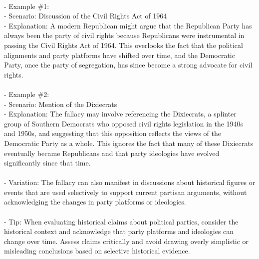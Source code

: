 \documentclass[a4paper,12pt,single,pdftex]{scrbook}
\begin{document}
    
      
    \\

    
      - Example \#1:
    \\

    
        - Scenario: Discussion of the Civil Rights Act of 1964
    \\

    
        - Explanation: A modern Republican might argue that the Republican Party has always been the party of civil rights because Republicans were instrumental in passing the Civil Rights Act of 1964. This overlooks the fact that the political alignments and party platforms have shifted over time, and the Democratic Party, once the party of segregation, has since become a strong advocate for civil rights.
    \\

    
      
    \\

    
      - Example \#2:
    \\

    
        - Scenario: Mention of the Dixiecrats
    \\

    
        - Explanation: The fallacy may involve referencing the Dixiecrats, a splinter group of Southern Democrats who opposed civil rights legislation in the 1940s and 1950s, and suggesting that this opposition reflects the views of the Democratic Party as a whole. This ignores the fact that many of these Dixiecrats eventually became Republicans and that party ideologies have evolved significantly since that time.
    \\

    
      
    \\

    
      - Variation: The fallacy can also manifest in discussions about historical figures or events that are used selectively to support current partisan arguments, without acknowledging the changes in party platforms or ideologies.
    \\

    
      
    \\

    
      - Tip: When evaluating historical claims about political parties, consider the historical context and acknowledge that party platforms and ideologies can change over time. Assess claims critically and avoid drawing overly simplistic or misleading conclusions based on selective historical evidence.
    \\
\end{document}
